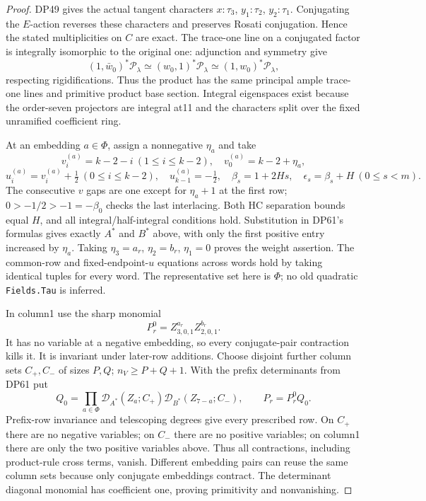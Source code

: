 \begin{proof}
DP49 gives the actual tangent characters $x:\tau_3$, $y_1:\tau_2$,
$y_2:\tau_1$. Conjugating the $E$-action reverses these characters and
preserves Rosati conjugation. Hence the stated multiplicities on $C$
are exact. The trace-one line on a conjugated factor is integrally
isomorphic to the original one: adjunction and symmetry give
\[
 (1,\bar w_0)^*\mathcal P_\lambda
 \simeq(w_0,1)^*\mathcal P_\lambda
 \simeq(1,w_0)^*\mathcal P_\lambda,
\]
respecting rigidifications. Thus the product has the same principal ample
trace-one lines and primitive product base section. Integral eigenspaces
exist because the order-seven projectors are integral at11 and the
characters split over the fixed unramified coefficient ring.

At an embedding $a\in\Phi$, assign a nonnegative $\eta_a$ and take
\[
 v_i^{(a)}=k-2-i\ (1\le i\le k-2),\quad
 v_0^{(a)}=k-2+\eta_a,
\]
\[
 u_i^{(a)}=v_i^{(a)}+\tfrac12\ (0\le i\le k-2),\quad
 u_{k-1}^{(a)}=-\tfrac12,
 \quad\beta_s=1+2Hs,\quad\epsilon_s=\beta_s+H\ (0\le s<m).
\]
The consecutive $v$ gaps are one except for $\eta_a+1$ at the first
row; $0>-1/2>-1=-\beta_0$ checks the last interlacing.
Both HC separation bounds equal $H$, and all integral/half-integral
conditions hold. Substitution in DP61's formulas gives exactly $A^*$
and $B^*$ above, with only the first positive entry increased by
$\eta_a$. Taking $\eta_3=a_r$, $\eta_2=b_r$, $\eta_1=0$ proves the
weight assertion. The common-row and fixed-endpoint-$u$ equations across
words hold by taking identical tuples for every word. The representative
set here is $\Phi$; no old quadratic \texttt{Fields.Tau} is inferred.

In column1 use the sharp monomial
\[
 P_r^0=Z_{3,0,1}^{a_r}Z_{2,0,1}^{b_r}.
\]
It has no variable at a negative embedding, so every conjugate-pair
contraction kills it. It is invariant under later-row additions.
Choose disjoint further column sets $C_+,C_-$ of sizes $P,Q$;
$n_V\ge P+Q+1$. With the prefix determinants from DP61 put
\[
 Q_0=\prod_{a\in\Phi}\mathcal D_{A^*}(Z_a;C_+)
                            \mathcal D_{B^*}(Z_{7-a};C_-),
 \qquad P_r=P_r^0Q_0.
\]
Prefix-row invariance and telescoping degrees give every prescribed row.
On $C_+$ there are no negative variables; on $C_-$ there are no positive
variables; on column1 there are only the two positive variables above.
Thus all contractions, including product-rule cross terms, vanish.
Different embedding pairs can reuse the same column sets because only
conjugate embeddings contract. The determinant diagonal monomial has
coefficient one, proving primitivity and nonvanishing.


\end{proof}
